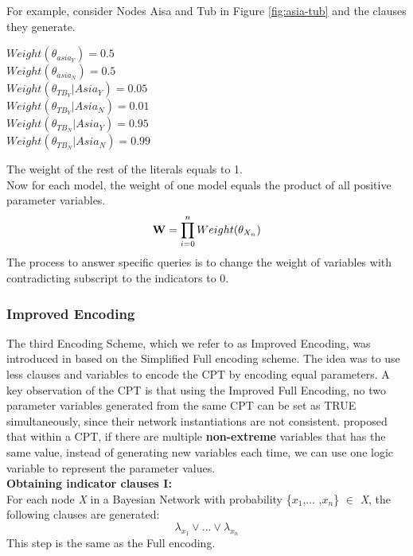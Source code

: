         For example, consider Nodes Aisa and Tub in Figure \ref{fig:asia-tub} and the clauses they generate. 
        \begin{center}
            $Weight(\theta_{asia_{Y}}) = 0.5$\\
            $Weight(\theta_{asia_{N}}) = 0.5$\\
            $Weight(\theta_{TB_{Y}}|Asia_{Y}) = 0.05$\\
            $Weight(\theta_{TB_{Y}}|Asia_{N}) = 0.01$\\
            $Weight(\theta_{TB_{N}}|Asia_{Y}) = 0.95$\\
            $Weight(\theta_{TB_{N}}|Asia_{N}) = 0.99$\\
        \end{center}
        The weight of the rest of the literals equals to 1. \\
        
        \noindent Now for each model, the weight of one model equals the product of all positive parameter variables. 
        $$\textbf{\textbf{W}} = \prod_{i = 0}^{n} Weight(\theta_{X_{n}}) $$
        The process to answer specific queries is to change the weight of variables with contradicting subscript to the indicators to 0.
        
        
        \subsubsection{Improved Encoding}
        The third Encoding Scheme, which we refer to as Improved Encoding, was introduced in \cite{enc2} based on the Simplified Full encoding scheme.
        The idea was to use less clauses and variables to encode the CPT by encoding equal parameters. A key observation of the CPT is that using the Improved Full Encoding, no two parameter variables generated from the same CPT can be set as TRUE simultaneously, since their network instantiations are not consistent. \cite{enc2} proposed that within a CPT, if there are multiple \textbf{non-extreme} variables that has the same value, instead of generating new variables each time, we can use one logic variable to represent the parameter values.\\
        
        \noindent \textbf{Obtaining indicator clauses \textsc{I}:}\\
        For each node \textit{X} in a Bayesian Network with probability \{$x_{1}$,... ,$x_{n}$\} $\in$ \textit{X}, the following clauses are generated:
        \begin{equation}\label{Improvedenc_ic}
            \lambda_{x_{1}} \vee ... \vee \lambda_{x_{n}}
        \end{equation}
        This step is the same as the Full encoding.\\

